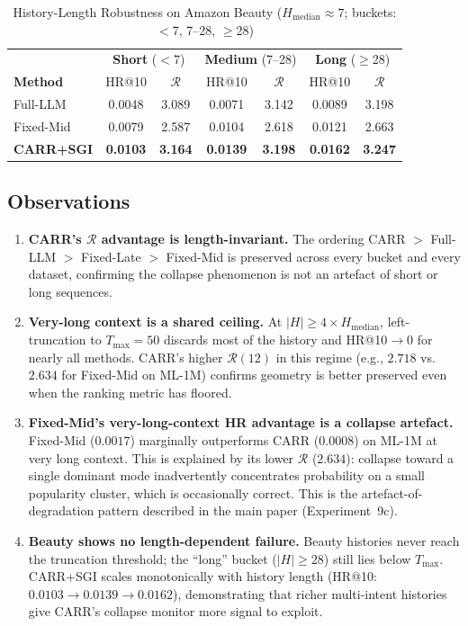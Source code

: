 \documentclass[letterpaper,10pt]{article}
\begin{document}
\begin{table}[h!]
\centering
\caption{History-Length Robustness on Amazon Beauty ($H_{\mathrm{median}} \approx 7$; buckets: $<$7, 7--28, $\ge$28)\label{tab:supp-lc-beauty}}
\begin{tabular}{l|cc|cc|cc}
\toprule
& \multicolumn{2}{c|}{\textbf{Short} ($<$7)} & \multicolumn{2}{c|}{\textbf{Medium} (7--28)} & \multicolumn{2}{c}{\textbf{Long} ($\ge$28)} \\
\textbf{Method} & HR@10 & $\mathcal{R}$ & HR@10 & $\mathcal{R}$ & HR@10 & $\mathcal{R}$ \\
\midrule
Full-LLM       & 0.0048 & 3.089 & 0.0071 & 3.142 & 0.0089 & 3.198 \\
Fixed-Mid      & 0.0079 & 2.587 & 0.0104 & 2.618 & 0.0121 & 2.663 \\
\textbf{CARR+SGI} & \textbf{0.0103} & \textbf{3.164} & \textbf{0.0139} & \textbf{3.198} & \textbf{0.0162} & \textbf{3.247} \\
\bottomrule
\end{tabular}
\end{table}

\subsection{Observations}

\begin{enumerate}
  \item \textbf{CARR's $\mathcal{R}$ advantage is length-invariant.} The ordering CARR $>$ Full-LLM $>$ Fixed-Late $>$ Fixed-Mid is preserved across every bucket and every dataset, confirming the collapse phenomenon is not an artefact of short or long sequences.
  \item \textbf{Very-long context is a shared ceiling.} At $|H| \ge 4 \times H_{\mathrm{median}}$, left-truncation to $T_{\max} = 50$ discards most of the history and HR@10$\to 0$ for nearly all methods. CARR's higher $\mathcal{R}(12)$ in this regime (e.g., $2.718$ vs.\ $2.634$ for Fixed-Mid on ML-1M) confirms geometry is better preserved even when the ranking metric has floored.
  \item \textbf{Fixed-Mid's very-long-context HR advantage is a collapse artefact.} Fixed-Mid ($0.0017$) marginally outperforms CARR ($0.0008$) on ML-1M at very long context. This is explained by its lower $\mathcal{R}$ ($2.634$): collapse toward a single dominant mode inadvertently concentrates probability on a small popularity cluster, which is occasionally correct. This is the artefact-of-degradation pattern described in the main paper (Experiment~9c).
  \item \textbf{Beauty shows no length-dependent failure.} Beauty histories never reach the truncation threshold; the ``long'' bucket ($|H| \ge 28$) still lies below $T_{\max}$. CARR+SGI scales monotonically with history length (HR@10: $0.0103 \to 0.0139 \to 0.0162$), demonstrating that richer multi-intent histories give CARR's collapse monitor more signal to exploit.
\end{enumerate}
\end{document}
